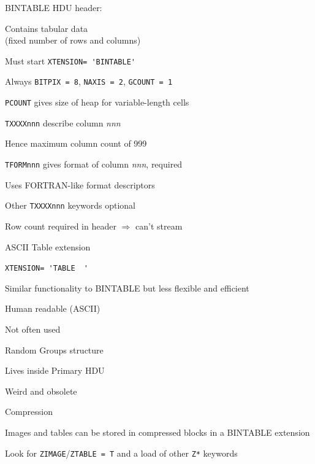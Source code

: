 \documentclass[20pt,landscape]{foils}
\begin{document}
\begin{list0}
  \item BINTABLE HDU header:
  \begin{list2big}
    \item Contains tabular data \\
          (fixed number of rows and columns)
    \item Must start {\color{brown}\verb*|XTENSION= 'BINTABLE'|}
    \item Always {\color{brown}\tt BITPIX = 8},
                 {\color{brown}\tt NAXIS = 2},
                 {\color{brown}\tt GCOUNT = 1}
    \item {\color{brown}\tt PCOUNT} gives size of heap for variable-length cells
    \item {\color{brown}\tt TXXXXnnn} describe column {\sl nnn}
    \begin{list3}
      \item Hence maximum column count of 999
    \end{list3}
    \item {\color{brown}\tt TFORMnnn} gives format of column {\sl nnn},
          required
    \begin{list3}
      \item Uses FORTRAN-like format descriptors
    \end{list3}
    \item Other {\color{brown}\tt TXXXXnnn} keywords optional
    \item Row count required in header $\Rightarrow$ can't stream
  \end{list2big}
\end{list0}


\begin{list1}
  \item ASCII Table extension
  \begin{list2big}
    \item {\color{brown}\verb*|XTENSION= 'TABLE  '|}
    \item Similar functionality to BINTABLE but less flexible and efficient
    \item Human readable (ASCII)
    \item Not often used
  \end{list2big}
  \item Random Groups structure
  \begin{list2big}
    \item Lives inside Primary HDU
    \item Weird and obsolete
  \end{list2big}
  \item Compression
  \begin{list2big}
    \item Images and tables can be stored in compressed blocks in a BINTABLE
          extension
    \item Look for {\color{brown}\tt ZIMAGE}/{\color{brown}\tt ZTABLE = T}
          and a load of other {\color{brown}\tt Z*} keywords
  \end{list2big}
\end{list1}
\end{document}
